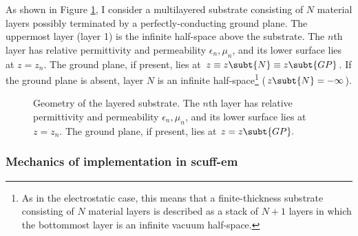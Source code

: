 \documentclass[letterpaper]{article}
\begin{document}
As shown in Figure \ref{SubstrateGeometryFigure}, I consider
a multilayered substrate consisting of $N$ material layers
possibly terminated by a perfectly-conducting ground plane.
The uppermost layer (layer 1) is the infinite half-space
above the substrate.
The $n$th layer
has relative permittivity and permeability $\epsilon_n,\mu_n$,
and its lower surface lies at $z=z_n$.
The ground plane, if present,
lies at $z\equiv z\subt{N}\equiv z\subt{GP}$.
If the ground plane is absent, layer $N$ is an
infinite half-space\footnote{As in the electrostatic case,
this means that a finite-thickness substrate consisting of
$N$ material layers is described as a stack of $N+1$ layers
in which the bottommost layer is an infinite vacuum half-space.}
($z\subt{N}=-\infty$).
\begin{figure}[!]
\begin{center}
\caption{Geometry of the layered substrate.
The $n$th layer 
has relative permittivity and permeability $\epsilon_n,\mu_n$,
and its lower surface lies at $z=z_n$. The ground plane, if present,
lies at $z=z\subt{GP}.$
}
\label{SubstrateGeometryFigure}
\end{center}
\end{figure}

\subsubsection*{Mechanics of implementation in {\sc scuff-em}}
\end{document}
